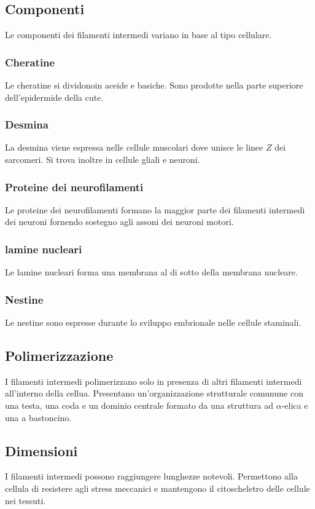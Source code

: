 	\subsection{Componenti}
	Le componenti dei filamenti intermedi variano in base al tipo cellulare.

		\subsubsection{Cheratine}
		Le cheratine si dividonoin aceide e basiche.
		Sono prodotte nella parte superiore dell'epidermide della cute.

		\subsubsection{Desmina}
		La desmina viene espressa nelle cellule muscolari dove unisce le linee $Z$ dei sarcomeri.
		Si trova inoltre in cellule gliali e neuroni.

		\subsubsection{Proteine dei neurofilamenti}
		Le proteine dei neurofilamenti formano la maggior parte dei filamenti intermedi dei neuroni fornendo sostegno agli assoni dei neuroni motori.

		\subsubsection{lamine nucleari}
		Le lamine nucleari forma una membrana al di sotto della membrana nucleare.

		\subsubsection{Nestine}
		Le nestine sono espresse durante lo sviluppo embrionale nelle cellule staminali.

	\subsection{Polimerizzazione}
	I filamenti intermedi polimerizzano solo in presenza di altri filamenti intermedi all'interno della cellua.
	Presentano un'organizzazione strutturale comunune con una testa, una coda e un dominio centrale formato da una struttura ad $\alpha$-elica e una a bastoncino.

	\subsection{Dimensioni}
	I filamenti intermedi possono raggiungere lunghezze notevoli.
	Permettono alla cellula di resistere agli stress meccanici e mantengono il citoscheletro delle cellule nei tessuti.

